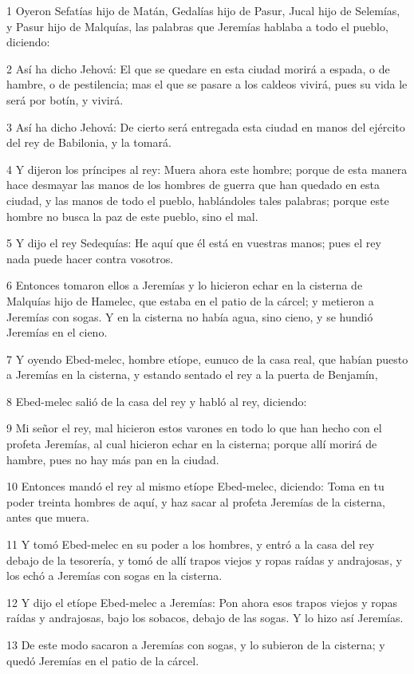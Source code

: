 \par 1 Oyeron Sefatías hijo de Matán, Gedalías hijo de Pasur, Jucal hijo de Selemías, y Pasur hijo de Malquías, las palabras que Jeremías hablaba a todo el pueblo, diciendo:
\par 2 Así ha dicho Jehová: El que se quedare en esta ciudad morirá a espada, o de hambre, o de pestilencia; mas el que se pasare a los caldeos vivirá, pues su vida le será por botín, y vivirá.
\par 3 Así ha dicho Jehová: De cierto será entregada esta ciudad en manos del ejército del rey de Babilonia, y la tomará.
\par 4 Y dijeron los príncipes al rey: Muera ahora este hombre; porque de esta manera hace desmayar las manos de los hombres de guerra que han quedado en esta ciudad, y las manos de todo el pueblo, hablándoles tales palabras; porque este hombre no busca la paz de este pueblo, sino el mal.
\par 5 Y dijo el rey Sedequías: He aquí que él está en vuestras manos; pues el rey nada puede hacer contra vosotros.
\par 6 Entonces tomaron ellos a Jeremías y lo hicieron echar en la cisterna de Malquías hijo de Hamelec, que estaba en el patio de la cárcel; y metieron a Jeremías con sogas. Y en la cisterna no había agua, sino cieno, y se hundió Jeremías en el cieno.
\par 7 Y oyendo Ebed-melec, hombre etíope, eunuco de la casa real, que habían puesto a Jeremías en la cisterna, y estando sentado el rey a la puerta de Benjamín,
\par 8 Ebed-melec salió de la casa del rey y habló al rey, diciendo:
\par 9 Mi señor el rey, mal hicieron estos varones en todo lo que han hecho con el profeta Jeremías, al cual hicieron echar en la cisterna; porque allí morirá de hambre, pues no hay más pan en la ciudad.
\par 10 Entonces mandó el rey al mismo etíope Ebed-melec, diciendo: Toma en tu poder treinta hombres de aquí, y haz sacar al profeta Jeremías de la cisterna, antes que muera.
\par 11 Y tomó Ebed-melec en su poder a los hombres, y entró a la casa del rey debajo de la tesorería, y tomó de allí trapos viejos y ropas raídas y andrajosas, y los echó a Jeremías con sogas en la cisterna.
\par 12 Y dijo el etíope Ebed-melec a Jeremías: Pon ahora esos trapos viejos y ropas raídas y andrajosas, bajo los sobacos, debajo de las sogas. Y lo hizo así Jeremías.
\par 13 De este modo sacaron a Jeremías con sogas, y lo subieron de la cisterna; y quedó Jeremías en el patio de la cárcel.

